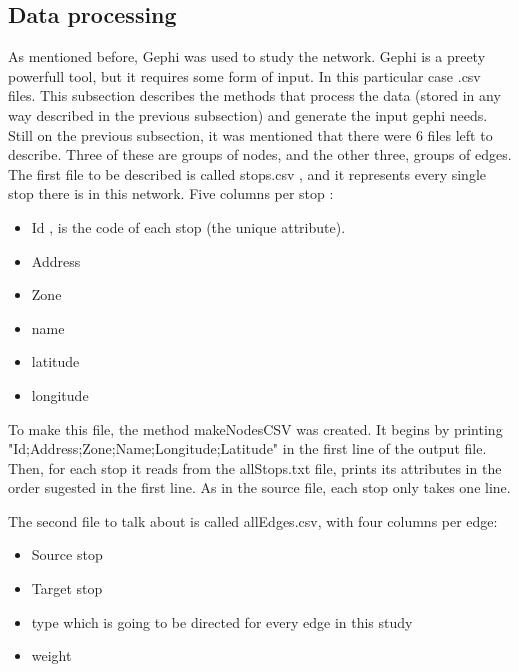 \documentclass[12pt]{report}
\begin{document}
\subsection{Data processing}
	
	As mentioned before, Gephi was used to study the network. Gephi is a preety powerfull tool, but it requires some form of input. In this particular case .csv files. This subsection describes the methods that process the data (stored in any way described in the previous subsection) and generate the input gephi needs.\\
	Still on the previous subsection, it was mentioned that there were 6 files left to describe. Three of these are groups of nodes, and the other three, groups of edges. \\
	
	The first file to be described is called stops.csv , and it represents every single stop there is in this network. Five columns per stop :
	
	\begin{itemize}
		\item Id , is the code of each stop (the unique attribute).
		\item Address
		\item Zone
		\item name
		\item latitude
		\item longitude
	\end{itemize}
	
	To make this file, the method makeNodesCSV was created.
	It begins by printing "Id;Address;Zone;Name;Longitude;Latitude" in the first line of the output file. Then, for each stop it reads from the allStops.txt file, prints its attributes in the order sugested in the first line. As in the source file, each stop only takes one line.
	
	The second file to talk about is called allEdges.csv, with four columns per edge:
	
	\begin{itemize}
		\item Source stop
		\item Target stop
		\item type which is going to be directed for every edge in this study
		\item weight 
	\end{itemize}
	
\end{document}
